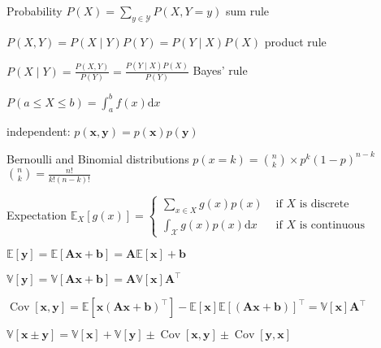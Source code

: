 \documentclass[UTF8,a4paper]{article}
\begin{document}
\begin{cheatsheetblock}{Probability}
    $P(X)=\sum_{y \in \mathscr{Y}} P(X, Y=y)$ \hfill sum rule

    $P(X, Y)=P(X \mid Y) P(Y)=P(Y \mid X) P(X)$ \hfill product rule

    $P(X \mid Y)=\frac{P(X, Y)}{P(Y)}=\frac{P(Y \mid X) P(X)}{P(Y)}$ \hfill Bayes' rule

    $P(a \leq X \leq b)=\int_{a}^{b} f(x) \mathrm{d} x$

    independent: $p(\mathbf{x}, \mathbf{y})=p(\mathbf{x}) p(\mathbf{y})$

\end{cheatsheetblock}

\begin{cheatsheetblock}{Bernoulli and Binomial distributions}
    $p(x=k)= {n \choose k} \times p^k (1-p)^{n-k}$ \hfill ${n \choose k} = \frac{n!}{k!(n-k)!}$
\end{cheatsheetblock}

\begin{cheatsheetblock}{Expectation}
    $\mathbb{E}_X[g(x)]= \begin{cases}\sum_{x \in X} g(x) p(x) & \text { if } X \text { is discrete } \\ \int_\mathscr{X} g(x) p(x) \mathrm{d} x & \text { if } X \text { is continuous }\end{cases}$

    $\mathbb{E}[\bm{y}]=\mathbb{E}[\bm{A x}+\bm{b}]=\bm{A} \mathbb{E}[\bm{x}]+\bm{b}$

    $\mathbb{V}[\bm{y}]=\mathbb{V}[\bm{A} \bm{x}+\bm{b}]=\bm{A} \mathbb{V}[\bm{x}] \bm{A}^{\top}$

    $\operatorname{Cov}[\bm{x}, \bm{y}]=\mathbb{E}\left[\bm{x}(\bm{A} \bm{x}+\bm{b})^{\top}\right]-\mathbb{E}[\bm{x}] \mathbb{E}[(\bm{A} \bm{x}+\bm{b})]^{\top}=\mathbb{V}[\bm{x}] \bm{A}^{\top}$

    $\mathbb{V}[\mathbf{x} \pm \mathbf{y}]=\mathbb{V}[\mathbf{x}]+\mathbb{V}[\mathbf{y}] \pm \operatorname{Cov}[\mathbf{x}, \mathbf{y}] \pm \operatorname{Cov}[\mathbf{y}, \mathbf{x}]$
\end{cheatsheetblock}
\end{document}
